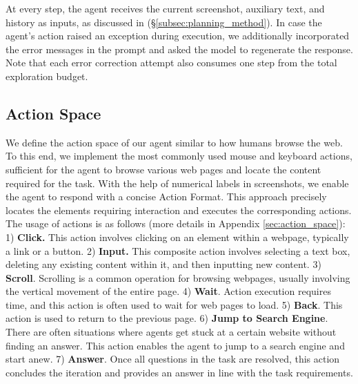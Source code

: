 \documentclass[11pt]{article}
\newcommand{\kaixin}[2][]{\todo[color=green,size=\scriptsize,fancyline,caption={},#1]{KM:#2}}
\begin{document}
At every step, the agent receives the current screenshot, auxiliary text, and history as inputs, as discussed in (\S\ref{subsec:planning_method}). In case the agent's action raised an exception during execution, we additionally incorporated the error messages in the prompt and asked the model to regenerate the response. Note that each error correction attempt also consumes one step from the total exploration budget. %

\subsection{Action Space}
We define the action space of our agent similar to how humans browse the web. 
To this end, we implement the most commonly used mouse and keyboard actions, sufficient for the agent to browse various web pages and locate the content required for the task. With the help of numerical labels in screenshots, we enable the agent to respond with a concise Action Format. This approach precisely locates the elements requiring interaction and executes the corresponding actions. The usage of actions is as follows (more details in Appendix \ref{sec:action_space}): %
1) \textbf{Click.} This action involves clicking on an element within a webpage, typically a link or a button. 
2) \textbf{Input.} This composite action involves selecting a text box, deleting any existing content within it, and then inputting new content.
3) \textbf{Scroll}. Scrolling is a common operation for browsing webpages, usually involving the vertical movement of the entire page. 
4) \textbf{Wait}. Action execution requires time, and this action is often used to wait for web pages to load. 
5) \textbf{Back}. This action is used to return to the previous page. 
6) \textbf{Jump to Search Engine}. There are often situations where agents get stuck at a certain website without finding an answer. This action enables the agent to jump to a search engine and start anew. 
7) \textbf{Answer}. Once all questions in the task are resolved, this action concludes the iteration and provides an answer in line with the task requirements. 
\end{document}
